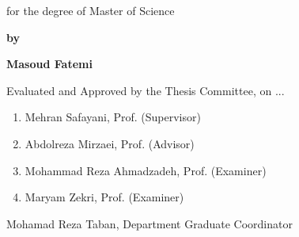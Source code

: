 \begin{latin}
\begin{center}
{	for the degree of Master of Science
}

	\vspace{1.5cm}

{\Large
	\textbf{by}
	
	\vspace{.3cm}
	
	\textbf{Masoud Fatemi}
}
\end{center}

\vfill

Evaluated and Approved by the Thesis Committee, on ...
\vspace{0.5cm}

\begin{enumerate}
\item Mehran Safayani, Prof. (Supervisor)
\vspace{0.5cm}

\item Abdolreza Mirzaei, Prof. (Advisor)
\vspace{0.5cm}

\item Mohammad Reza Ahmadzadeh, Prof. (Examiner)
\vspace{0.5cm}

\item Maryam Zekri, Prof. (Examiner)
\vspace{0.5cm}

\end{enumerate}

Mohamad Reza Taban, Department Graduate Coordinator

\pagebreak
\end{latin}

\thispagestyle{empty}
\mbox{}


